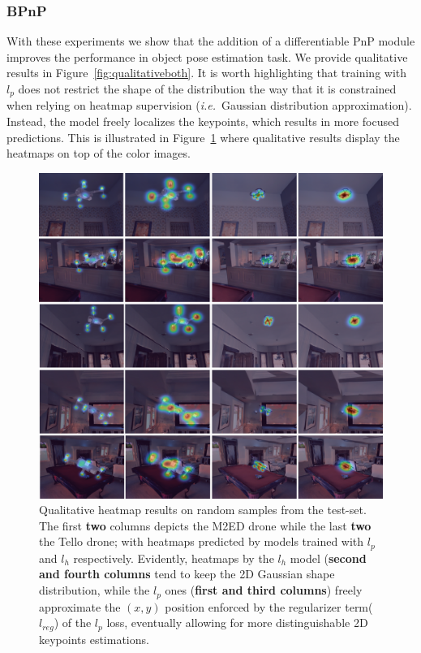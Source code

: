 \subsubsection{BPnP}
With these experiments we show that the addition of a differentiable PnP module improves the performance in object pose estimation task.
We provide qualitative results in Figure~\ref{fig:qualitativeboth}. 
It is worth highlighting that training with $l_p$ does not restrict the shape of the distribution the way that it is constrained when relying on heatmap supervision (\textit{i.e.}~Gaussian distribution approximation).
Instead, the model freely localizes the keypoints, which results in more focused predictions. 
This is illustrated in Figure~\ref{fig:qualitativehtmps} where qualitative results display the heatmaps on top of the color images. 

\begin{figure}[hbt!]
  \centering
  \includegraphics[scale=0.70]{../openreview/figures/qualitativeheatmaps.png}
  \caption{Qualitative heatmap results on random samples from the test-set. 
  The first \textbf{two} columns depicts the M2ED drone while the last \textbf{two} the Tello drone; with heatmaps predicted by models trained with $l_p$ and $l_h$ respectively.
  Evidently, heatmaps by the $l_h$ model (\textbf{second and fourth columns} tend to keep the 2D Gaussian shape distribution, while the $l_p$ ones (\textbf{first and third columns}) freely approximate the $(x,y)$ position enforced by the regularizer term($l_{reg}$) of the $l_p$ loss, eventually allowing for more distinguishable 2D keypoints estimations.}
\label{fig:qualitativehtmps}
\end{figure}
